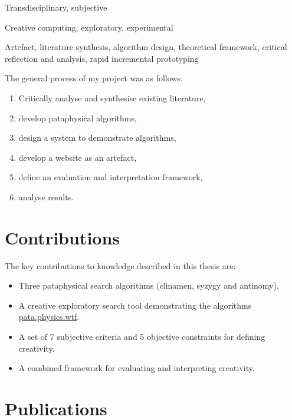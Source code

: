 \begin{description}[leftmargin=3cm]
  \item [Epistemology] Transdisciplinary, subjective
  \item [Methodology] Creative computing, exploratory, experimental
  \item [Methods] Artefact, literature synthesis, algorithm design, theoretical framework, critical reflection and analysis, rapid incremental prototyping
\end{description}

The general process of my project was as follows.

\begin{enumerate}
  \item Critically analyse and synthesise existing literature,\sidepar{\textspiral~\ref{p:lit}}
  \item develop pataphysical algorithms,\sidepar{\textspiral~\ref{p:practice}}
  \item design a system to demonstrate algorithms,\sidepar{\textspiral~\ref{p:practice}}
  \item develop a website as an artefact,\sidepar{\textspiral~\ref{p:practice}}
  \item define an evaluation and interpretation framework,\sidepar{\textspiral~\ref{p:theory}}
  \item analyse results.\sidepar{\textspiral~\ref{p:analysis}}
\end{enumerate}


\section{Contributions}

The key contributions to knowledge described in this thesis are:

\begin{itemize}
  \item Three pataphysical search algorithms (clinamen, syzygy and antinomy).
  \item A creative exploratory search tool demonstrating the algorithms \url{pata.physics.wtf}.
  \item A set of 7 subjective criteria and 5 objective constraints for defining creativity.
  \item A combined framework for evaluating and interpreting creativity.
\end{itemize}


\section{Publications}

